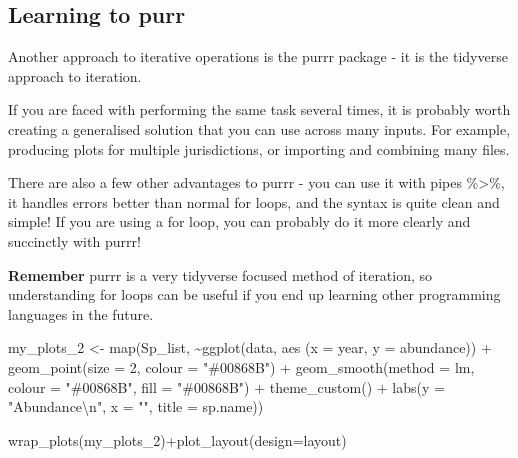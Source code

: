 \documentclass[
]{book}
\newenvironment{Shaded}{\begin{snugshade}}{\end{snugshade}}
\newcommand{\AttributeTok}[1]{\textcolor[rgb]{0.77,0.63,0.00}{#1}}
\newcommand{\DecValTok}[1]{\textcolor[rgb]{0.00,0.00,0.81}{#1}}
\newcommand{\FunctionTok}[1]{\textcolor[rgb]{0.00,0.00,0.00}{#1}}
\newcommand{\NormalTok}[1]{#1}
\newcommand{\OtherTok}[1]{\textcolor[rgb]{0.56,0.35,0.01}{#1}}
\newcommand{\SpecialCharTok}[1]{\textcolor[rgb]{0.00,0.00,0.00}{#1}}
\newcommand{\StringTok}[1]{\textcolor[rgb]{0.31,0.60,0.02}{#1}}
\begin{document}
\hypertarget{learning-to-purr}{%
\subsection{\texorpdfstring{Learning to \textbf{purr}}{Learning to purr}}\label{learning-to-purr}}

Another approach to iterative operations is the purrr package - it is the tidyverse approach to iteration.

If you are faced with performing the same task several times, it is probably worth creating a generalised solution that you can use across many inputs. For example, producing plots for multiple jurisdictions, or importing and combining many files.

There are also a few other advantages to purrr - you can use it with pipes \%\textgreater\%, it handles errors better than normal for loops, and the syntax is quite clean and simple! If you are using a for loop, you can probably do it more clearly and succinctly with purrr!

\textbf{Remember} purrr is a very tidyverse focused method of iteration, so understanding for loops can be useful if you end up learning other programming languages in the future.

\begin{Shaded}
\begin{Highlighting}[]
\NormalTok{my\_plots\_2 }\OtherTok{\textless{}{-}} \FunctionTok{map}\NormalTok{(Sp\_list, }\SpecialCharTok{\textasciitilde{}}\FunctionTok{ggplot}\NormalTok{(data, }\FunctionTok{aes}\NormalTok{ (}\AttributeTok{x =}\NormalTok{ year, }\AttributeTok{y =}\NormalTok{ abundance)) }\SpecialCharTok{+}              
                      \FunctionTok{geom\_point}\NormalTok{(}\AttributeTok{size =} \DecValTok{2}\NormalTok{, }\AttributeTok{colour =} \StringTok{"\#00868B"}\NormalTok{) }\SpecialCharTok{+}                                                
                      \FunctionTok{geom\_smooth}\NormalTok{(}\AttributeTok{method =}\NormalTok{ lm, }\AttributeTok{colour =} \StringTok{"\#00868B"}\NormalTok{, }\AttributeTok{fill =} \StringTok{"\#00868B"}\NormalTok{) }\SpecialCharTok{+}          
                      \FunctionTok{theme\_custom}\NormalTok{() }\SpecialCharTok{+}
                      \FunctionTok{labs}\NormalTok{(}\AttributeTok{y =} \StringTok{"Abundance}\SpecialCharTok{\textbackslash{}n}\StringTok{"}\NormalTok{, }\AttributeTok{x =} \StringTok{""}\NormalTok{, }\AttributeTok{title =}\NormalTok{ sp.name)) }


\FunctionTok{wrap\_plots}\NormalTok{(my\_plots\_2)}\SpecialCharTok{+}\FunctionTok{plot\_layout}\NormalTok{(}\AttributeTok{design=}\NormalTok{layout)}
\end{Highlighting}
\end{Shaded}
\end{document}
